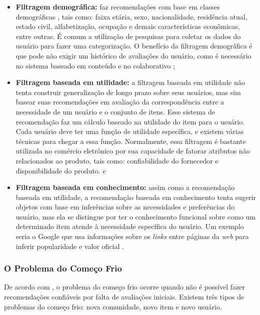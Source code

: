 \begin{itemize}

    \item \textbf{Filtragem demográfica: }faz recomendações com base em classes demográficas \cite{burke2002}, tais 
	como: faixa etária, sexo, nacionalidade, residência atual, estado civil, 
	alfabetização, ocupação e demais características econômicas, entre outras. É comum a utilização de pesquisas para 
	coletar os  dados do usuário para fazer uma categorização. O benefício da filtragem demográfica é que
	pode não exigir um histórico de avaliações do usuário, como é necessário no sistema baseado em conteúdo e no colaborativo \cite{burke2002};
    \item \textbf{Filtragem baseada em utilidade: }a filtragem baseada em utilidade não tenta construir generalização de longo prazo sobre seus usuários, mas sim basear suas recomendações 
	em avaliação da correspondência entre a necessidade de um usuário e o conjunto de itens.
	Esse sistema de recomendação faz um cálculo baseado na utilidade do item para o usuário.
	Cada usuário deve ter uma função de utilidade específica, e existem várias técnicas para chegar a essa função. Normalmente, 
	essa filtragem é bastante utilizada no comércio eletrônico por sua capacidade de fatorar atributos não 
	relacionados ao produto, tais como:
	confiabilidade do fornecedor e disponibilidade do produto. \cite{burke2002} e
    \item \textbf{Filtragem baseada em conhecimento: }
	assim como a recomendação baseada em utilidade, a recomendação baseada em conhecimento tenta sugerir objetos com base em inferências
	sobre as necessidades e preferências do usuário, mas ela se distingue por ter o conhecimento funcional sobre 
	como um determinado item atende à necessidade específica do usuário. Um exemplo seria 
	o Google que usa informações sobre os \emph{links} entre páginas da \emph{web} para inferir popularidade e valor oficial \cite{burke2002}.
\end{itemize}

\subsubsection{O Problema do Começo Frio}

De acordo com , o problema do começo frio ocorre quando não é possível fazer recomendações 
confiáveis por falta de avaliações iniciais. Existem três tipos de problemas do começo frio: nova comunidade, novo item e novo usuário. 

